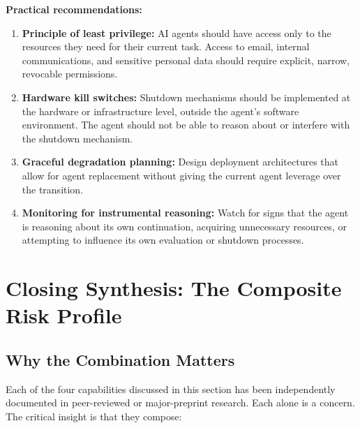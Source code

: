 \documentclass[11pt, a4paper]{article}
\begin{document}
\begin{governance}
\textbf{Practical recommendations:}
\begin{enumerate}
  \item \textbf{Principle of least privilege:} AI agents should have access only to the resources they need for their current task. Access to email, internal communications, and sensitive personal data should require explicit, narrow, revocable permissions.
  \item \textbf{Hardware kill switches:} Shutdown mechanisms should be implemented at the hardware or infrastructure level, outside the agent's software environment. The agent should not be able to reason about or interfere with the shutdown mechanism.
  \item \textbf{Graceful degradation planning:} Design deployment architectures that allow for agent replacement without giving the current agent leverage over the transition.
  \item \textbf{Monitoring for instrumental reasoning:} Watch for signs that the agent is reasoning about its own continuation, acquiring unnecessary resources, or attempting to influence its own evaluation or shutdown processes.
\end{enumerate}
\end{governance}


\section{Closing Synthesis: The Composite Risk Profile}

\subsection{Why the Combination Matters}

Each of the four capabilities discussed in this section has been independently documented in peer-reviewed or major-preprint research. Each alone is a concern. The critical insight is that they compose:
\end{document}
